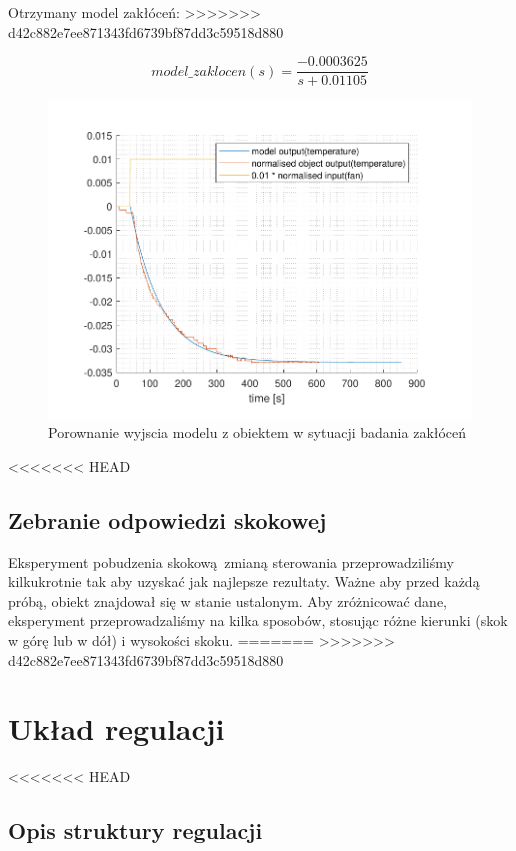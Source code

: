 \documentclass{mwrep}
\begin{document}
Otrzymany model zakłóceń:
>>>>>>> d42c882e7ee871343fd6739bf87dd3c59518d880

\[model\_zaklocen(s) = \frac{-0.0003625}{s + 0.01105}\]

\begin{figure}[H]
\centering
\includegraphics[scale=0.8]{materialy/krystian_plots/wykresik_zaklocenia.pdf}
\caption{Porownanie wyjscia modelu z obiektem w sytuacji badania zakłóceń}
\end{figure}

<<<<<<< HEAD
\section{Zebranie odpowiedzi skokowej}
\label{OdpowiedzSkokowa}
Eksperyment pobudzenia skokową zmianą sterowania przeprowadziliśmy kilkukrotnie tak aby uzyskać jak najlepsze rezultaty. Ważne aby przed 
każdą próbą, obiekt znajdował się w stanie ustalonym. Aby zróżnicować dane, eksperyment przeprowadzaliśmy na kilka sposobów, stosując różne 
kierunki (skok w górę lub w dół) i wysokości skoku.
=======
>>>>>>> d42c882e7ee871343fd6739bf87dd3c59518d880

\chapter{Układ regulacji}
\label{UkladRegulacji}

<<<<<<< HEAD

\section{Opis struktury regulacji}
\label{OpisStruktury}
\end{document}
